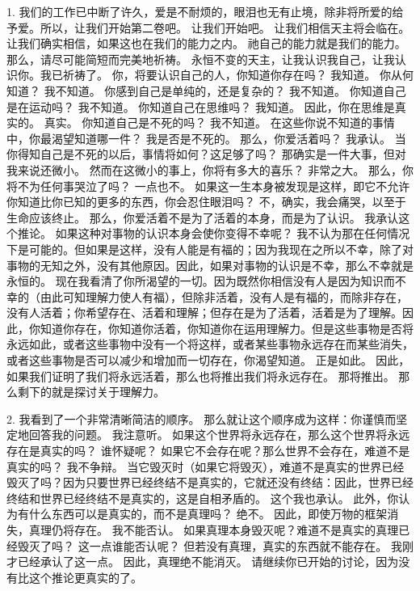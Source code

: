1.  我们的工作已中断了许久，爱是不耐烦的，眼泪也无有止境，除非将所爱的给予爱。所以，让我们开始第二卷吧。 让我们开始吧。 让我们相信天主将会临在。 让我们确实相信，如果这也在我们的能力之内。 祂自己的能力就是我们的能力。 那么，请尽可能简短而完美地祈祷。 永恒不变的天主，让我认识我自己，让我认识你。我已祈祷了。 你，将要认识自己的人，你知道你存在吗？ 我知道。 你从何知道？ 我不知道。 你感到自己是单纯的，还是复杂的？ 我不知道。 你知道自己是在运动吗？ 我不知道。 你知道自己在思维吗？ 我知道。 因此，你在思维是真实的。 真实。 你知道自己是不死的吗？ 我不知道。 在这些你说不知道的事情中，你最渴望知道哪一件？ 我是否是不死的。 那么，你爱活着吗？ 我承认。 当你得知自己是不死的以后，事情将如何？这足够了吗？ 那确实是一件大事，但对我来说还微小。 然而在这微小的事上，你将有多大的喜乐？ 非常之大。 那么，你将不为任何事哭泣了吗？ 一点也不。 如果这一生本身被发现是这样，即它不允许你知道比你已知的更多的东西，你会忍住眼泪吗？ 不，确实，我会痛哭，以至于生命应该终止。 那么，你爱活着不是为了活着的本身，而是为了认识。 我承认这个推论。 如果这种对事物的认识本身会使你变得不幸呢？ 我不认为那在任何情况下是可能的。但如果是这样，没有人能是有福的；因为我现在之所以不幸，除了对事物的无知之外，没有其他原因。因此，如果对事物的认识是不幸，那么不幸就是永恒的。 现在我看清了你所渴望的一切。因为既然你相信没有人是因为知识而不幸的（由此可知理解力使人有福），但除非活着，没有人是有福的，而除非存在，没有人活着；你希望存在、活着和理解；但存在是为了活着，活着是为了理解。因此，你知道你存在，你知道你活着，你知道你在运用理解力。但是这些事物是否将永远如此，或者这些事物中没有一个将这样，或者某些事物永远存在而某些消失，或者这些事物是否可以减少和增加而一切存在，你渴望知道。 正是如此。 因此，如果我们证明了我们将永远活着，那么也将推出我们将永远存在。 那将推出。 那么剩下的就是探讨关于理解力。\par

2.  我看到了一个非常清晰简洁的顺序。 那么就让这个顺序成为这样：你谨慎而坚定地回答我的问题。 我注意听。 如果这个世界将永远存在，那么这个世界将永远存在是真实的吗？ 谁怀疑呢？ 如果它不会存在呢？那么世界不会存在，难道不是真实的吗？ 我不争辩。 当它毁灭时（如果它将毁灭），难道不是真实的世界已经毁灭了吗？因为只要世界已经终结不是真实的，它就还没有终结：因此，世界已经终结和世界已经终结不是真实的，这是自相矛盾的。 这个我也承认。 此外，你认为有什么东西可以是真实的，而不是真理吗？ 绝不。 因此，即使万物的框架消失，真理仍将存在。 我不能否认。 如果真理本身毁灭呢？难道不是真实的真理已经毁灭了吗？ 这一点谁能否认呢？ 但若没有真理，真实的东西就不能存在。 我刚才已经承认了这一点。 因此，真理绝不能消灭。 请继续你已开始的讨论，因为没有比这个推论更真实的了。\par

